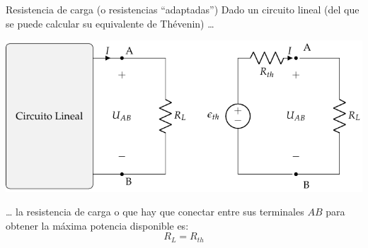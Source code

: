\documentclass[aspectratio=169, xcolor={usenames,svgnames,dvipsnames}]{beamer}
\begin{document}

\begin{frame}{Resistencia de carga \hspace{3mm}(o resistencias ``adaptadas'')}
    Dado un circuito lineal (del que se puede calcular su equivalente de Thévenin) \ldots{}
    \begin{center}
        \includegraphics[height=0.45\textheight]{../figs/EquivalenteThevenin_R.pdf}
    \end{center}
    
    \ldots{} la \alert{resistencia de carga} o  que hay que conectar entre sus terminales $AB$ para obtener la máxima potencia disponible es:
    \[
      \boxed{R_L = R_{th}}
    \]
\end{frame}

\end{document}
